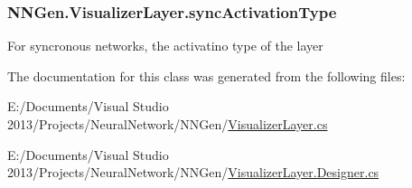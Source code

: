 \hypertarget{class_n_n_gen_1_1_visualizer_layer_a4e3138e1ee1d9220ff8c53d0ac860f14}{}
\subsubsection[{sync\+Activation\+Type}]{ N\+N\+Gen.\+Visualizer\+Layer.\+sync\+Activation\+Type\hspace{0.3cm}{\ttfamily [get]}}\label{class_n_n_gen_1_1_visualizer_layer_a4e3138e1ee1d9220ff8c53d0ac860f14}


For syncronous networks, the activatino type of the layer 



The documentation for this class was generated from the following files\+:\begin{DoxyCompactItemize}
\item 
E\+:/\+Documents/\+Visual Studio 2013/\+Projects/\+Neural\+Network/\+N\+N\+Gen/\hyperlink{_visualizer_layer_8cs}{Visualizer\+Layer.\+cs}\item 
E\+:/\+Documents/\+Visual Studio 2013/\+Projects/\+Neural\+Network/\+N\+N\+Gen/\hyperlink{_visualizer_layer_8_designer_8cs}{Visualizer\+Layer.\+Designer.\+cs}\end{DoxyCompactItemize}
